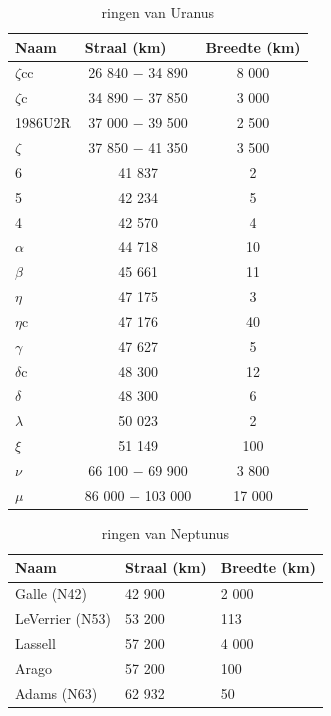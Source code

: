 \documentclass[a4paper]{article}
\begin{document}
	 \begin{table}[h!]
	 	\caption{ringen van Uranus}
	 	\centering
	 	\begin{tabular}{|l|cc|}
	 		\hline
	 		\multicolumn{1}{|l|}{\textbf{Naam}}          & \multicolumn{1}{l}{\textbf{Straal (km)}} & \multicolumn{1}{l|}{\textbf{Breedte (km)}} \\ \hline
	 		$\zeta$cc   & 26 840 $-$ 34 890  & 8 000        \\
	 		$\zeta$c    & 34 890 $-$ 37 850  & 3 000        \\
	 		1986U2R     & 37 000 $-$ 39 500  & 2 500        \\
	 		$\zeta$     & 37 850 $-$ 41 350  & 3 500        \\
	 		6           & 41 837         & 2            \\
	 		5           & 42 234         & 5            \\
	 		4           & 42 570         & 4            \\
	 		$\alpha$    & 44 718         & 10           \\
	 		$\beta$     & 45 661         & 11           \\
	 		$\eta $     & 47 175         & 3            \\
	 		$\eta$c     & 47 176         & 40           \\
	 		$\gamma$    & 47 627         & 5            \\
	 		$\delta$c   & 48 300         & 12           \\
	 		$\delta $   & 48 300         & 6            \\
	 		$\lambda$   & 50 023         & 2            \\
	 		$\xi   $    & 51 149         & 100          \\
	 		$\nu$       & 66 100 $-$ 69 900  & 3 800        \\
	 		$\mu $      & 86 000 $-$ 103 000 & 17 000       \\ \hline
	 	\end{tabular}
	 \end{table}
	 \newpage
	 \begin{table}[h]
	 	\caption{ringen van Neptunus}
	 	\centering
	 	\begin{tabular}{|l|ll|}
	 		\hline
\multicolumn{1}{|l|}{\textbf{Naam}}          & \multicolumn{1}{l}{\textbf{Straal (km)}} & \multicolumn{1}{l|}{\textbf{Breedte (km)}} \\ \hline
	 		Galle (N42)      & 42 900   & 2 000            \\
	 		LeVerrier (N53)  & 53 200   & 113           \\
	 		Lassell          &  57 200  & 4 000            \\
	 		Arago            & 57 200   &  100 \\
	 		Adams (N63)      & 62 932   &  50         \\ \hline
	 	\end{tabular}
	 \end{table}
\end{document}
